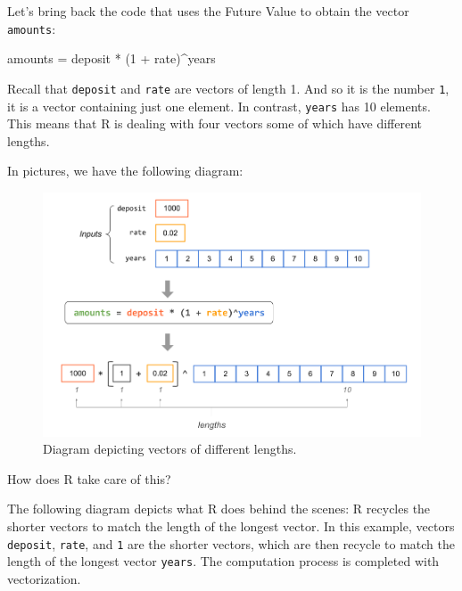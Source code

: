 \documentclass[
]{book}
\newenvironment{Shaded}{\begin{snugshade}}{\end{snugshade}}
\newcommand{\DecValTok}[1]{\textcolor[rgb]{0.00,0.00,0.81}{#1}}
\newcommand{\NormalTok}[1]{#1}
\newcommand{\OtherTok}[1]{\textcolor[rgb]{0.56,0.35,0.01}{#1}}
\newcommand{\SpecialCharTok}[1]{\textcolor[rgb]{0.00,0.00,0.00}{#1}}
\begin{document}
Let's bring back the code that uses the Future Value to obtain the vector
\texttt{amounts}:

\begin{Shaded}
\begin{Highlighting}[]
\NormalTok{amounts }\OtherTok{=}\NormalTok{ deposit }\SpecialCharTok{*}\NormalTok{ (}\DecValTok{1} \SpecialCharTok{+}\NormalTok{ rate)}\SpecialCharTok{\^{}}\NormalTok{years}
\end{Highlighting}
\end{Shaded}

Recall that \texttt{deposit} and \texttt{rate} are vectors of length 1. And so it is the
number \texttt{1}, it is a vector containing just one element. In contrast, \texttt{years}
has 10 elements. This means that R is dealing with four vectors some of which
have different lengths.

In pictures, we have the following diagram:

\begin{figure}

{\centering \includegraphics[width=0.9\linewidth]{images/vectors/vectorized1} 

}

\caption{Diagram depicting vectors of different lengths.}\label{fig:unnamed-chunk-74}
\end{figure}

How does R take care of this?

The following diagram depicts what R does behind the scenes: R recycles the
shorter vectors to match the length of the longest vector. In this example,
vectors \texttt{deposit}, \texttt{rate}, and \texttt{1} are the shorter vectors, which are then
recycle to match the length of the longest vector \texttt{years}. The computation
process is completed with vectorization.
\end{document}

